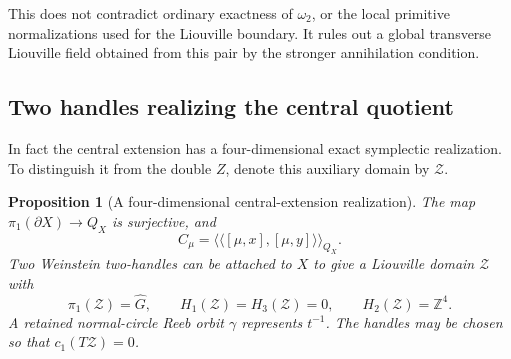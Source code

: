 \documentclass[11pt]{amsart}
\newtheorem{proposition}[theorem]{Proposition}
\theoremstyle{definition}
\theoremstyle{remark}
\newcommand{\Z}{\mathbb Z}
\newcommand{\nc}[1]{\langle\!\langle #1\rangle\!\rangle}
\begin{document}
This does not contradict ordinary exactness of $\omega_2$, or the
local primitive normalizations used for the Liouville boundary. It
rules out a global transverse Liouville field obtained from this pair
by the stronger annihilation condition.

\subsection{Two handles realizing the central quotient}\label{subsec:handles}

In fact the central extension has a four-dimensional exact symplectic
realization. To distinguish it from the double $Z$, denote this
auxiliary domain by $\mathcal Z$.

\begin{proposition}[A four-dimensional central-extension realization]\label{prop:two-handles}
The map $\pi_1(\partial X)\to Q_X$ is surjective, and
\[
 C_\mu=\nc{[\mu,x],[\mu,y]}_{Q_X}.
\]
Two Weinstein two-handles can be attached to $X$ to give a Liouville
domain $\mathcal Z$ with
\[
 \pi_1(\mathcal Z)=\widehat G,\qquad
 H_1(\mathcal Z)=H_3(\mathcal Z)=0,\qquad H_2(\mathcal Z)=\Z^4.
\]
A retained normal-circle Reeb orbit $\gamma$ represents $t^{-1}$.
The handles may be chosen so that $c_1(T\mathcal Z)=0$.
\end{proposition}
\end{document}
